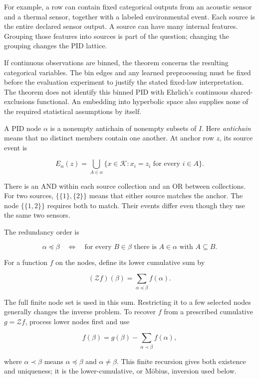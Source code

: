 For example, a row can contain fixed categorical outputs from an acoustic sensor and a thermal sensor, together with a labeled environmental event. Each source is the entire declared sensor output. A source can have many internal features. Grouping those features into sources is part of the question; changing the grouping changes the PID lattice.

If continuous observations are binned, the theorem concerns the resulting categorical variables. The bin edges and any learned preprocessing must be fixed before the evaluation experiment to justify the stated fixed-law interpretation. The theorem does not identify this binned PID with Ehrlich's continuous shared-exclusions functional. An embedding into hyperbolic space also supplies none of the required statistical assumptions by itself.

\label{a-node-is-a-collection-of-alternatives}

A PID node \(\alpha\) is a nonempty antichain of nonempty subsets of \(I\). Here \emph{antichain} means that no distinct members contain one another. At anchor row \(z\), its source event is

\[
E_\alpha(z)=
\bigcup_{A\in\alpha}
\{x\in\mathcal K:x_i=z_i\text{ for every }i\in A\}.
\]

There is an AND within each source collection and an OR between collections. For two sources, \(\{\{1\},\{2\}\}\) means that either source matches the anchor. The node \(\{\{1,2\}\}\) requires both to match. Their events differ even though they use the same two sensors.

The redundancy order is

\[
\alpha\preceq\beta
\quad\Longleftrightarrow\quad
\text{for every }B\in\beta\text{ there is }A\in\alpha\text{ with }A\subseteq B.
\]

For a function \(f\) on the nodes, define its lower cumulative sum by

\[
(\mathcal Zf)(\beta)=\sum_{\alpha\preceq\beta}f(\alpha).
\]

The full finite node set is used in this sum. Restricting it to a few selected nodes generally changes the inverse problem. To recover \(f\) from a prescribed cumulative \(g=\mathcal Zf\), process lower nodes first and use

\[
f(\beta)=g(\beta)-\sum_{\alpha\prec\beta}f(\alpha),
\]

where \(\alpha\prec\beta\) means \(\alpha\preceq\beta\) and \(\alpha\ne\beta\). This finite recursion gives both existence and uniqueness; it is the lower-cumulative, or Möbius, inversion used below.

